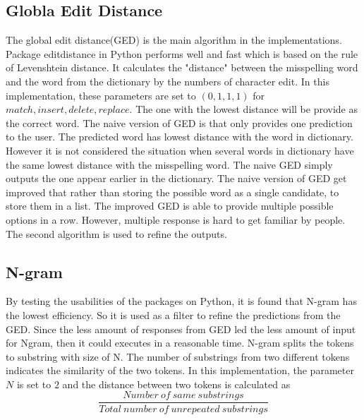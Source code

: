 \documentclass[11pt]{article}
\begin{document}
\subsection{Globla Edit Distance}
The global edit distance(GED) is the main algorithm in the implementations. Package editdistance in Python performs well and fast which is based on the rule of Levenshtein distance. It calculates the "distance" between the misspelling word and the word from the dictionary by the numbers of character edit. In this implementation, these parameters are set to $(0, 1, 1, 1)$ for $match, insert, delete, replace$. The one with the lowest distance will be provide as the correct word. The naive version of GED is that only provides one prediction to the user. The predicted word has lowest distance with the word in dictionary. However it is not considered the situation when several words in dictionary have the same lowest distance with the misspelling word. The naive GED simply outputs the one appear earlier in the dictionary. The naive version of GED get improved that rather than storing the possible word as a single candidate, to store them in a list. The improved GED is able to provide multiple possible options in a row. However, multiple response is hard to get familiar by people. The second algorithm is used to refine the outputs.

\subsection{N-gram}
By testing the usabilities of the packages on Python, it is found that N-gram has the lowest efficiency. So it is used as a filter to refine the predictions from the GED. Since the less amount of responses from GED led the less amount of input for Ngram, then it could executes in a reasonable time. N-gram splits the tokens to substring with size of N. The number of substrings from two different tokens indicates the similarity of the two tokens. In this implementation, the parameter $N$ is set to $2$ and the distance between two tokens is calculated as
\[\frac{Number\ of\ same\ substrings}{Total\ number\ of\ unrepeated\ substrings}\]
\end{document}
